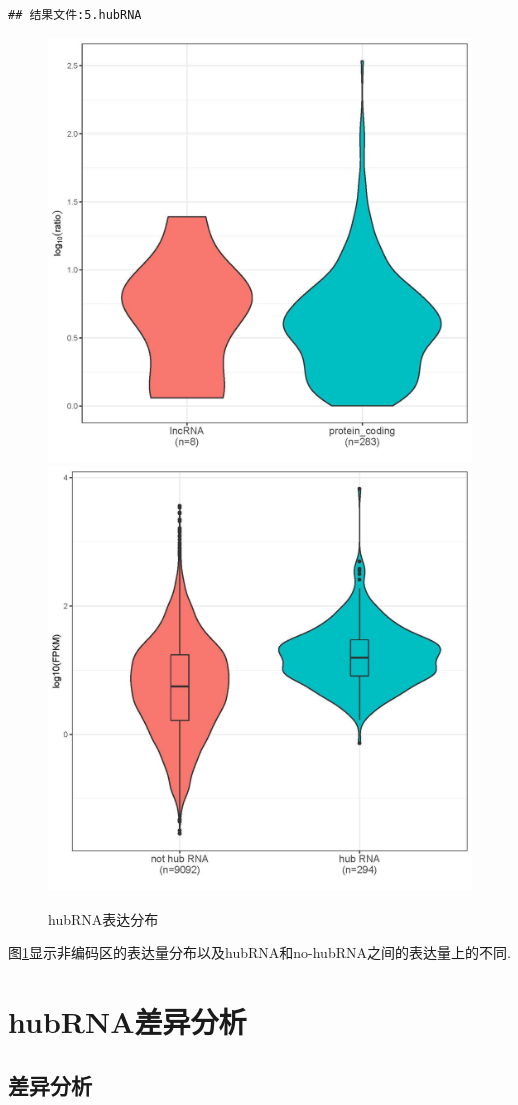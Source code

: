\documentclass[
]{ctexart}
\begin{document}
\begin{verbatim}
## 结果文件:5.hubRNA
\end{verbatim}

\begin{figure}[H]

{\centering \includegraphics[width=0.48\linewidth]{./1.picture/hubRNA_ric_vs_rna.violin} \includegraphics[width=0.48\linewidth]{./1.picture/hubRNA_vs_nohubRNA_FPKM} 

}

\caption{hubRNA表达分布}\label{fig:hub2}
\end{figure}

图\ref{fig:hub2}显示非编码区的表达量分布以及hubRNA和no-hubRNA之间的表达量上的不同.

\hypertarget{hubrnaux5deeux5f02ux5206ux6790}{%
\section{hubRNA差异分析}\label{hubrnaux5deeux5f02ux5206ux6790}}

\hypertarget{ux5deeux5f02ux5206ux6790-1}{%
\subsection{差异分析}\label{ux5deeux5f02ux5206ux6790-1}}
\end{document}
